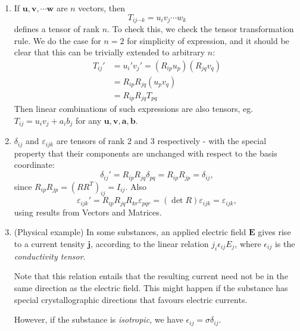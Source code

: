 \documentclass[a4paper]{article}
\begin{document}
\begin{eg}\leavevmode
  \begin{enumerate}
    \item If $\mathbf{u}, \mathbf{v}, \cdots\mathbf{w}$ are $n$ vectors, then
      \[
        T_{ij\cdots k} =u_i v_j \cdots w_k
      \]
      defines a tensor of rank $n$. To check this, we check the tensor transformation rule. We do the case for $n = 2$ for simplicity of expression, and it should be clear that this can be trivially extended to arbitrary $n$:
      \begin{align*}
        T_{ij}' &= u_i'v_j' = (R_{ip} u_p)(R_{jq}v_q)\\
        &= R_{ip}R_{jq}(u_p v_q)\\
        &= R_{ip}R_{jq}T_{pq}
      \end{align*}
      Then linear combinations of such expressions are also tensors, eg. $T_{ij} = u_i v_j + a_ib_j$ for any $\mathbf{u}, \mathbf{v}, \mathbf{a},\mathbf{b}$.
    \item $\delta_{ij}$ and $\varepsilon_{ijk}$ are tensors of rank 2 and 3 respectively - with  the special property that their components are unchanged with respect to the basis coordinate:
      \[
        \delta_{ij}' = R_{ip}R_{jq}\delta_{pq} = R_{ip}R_{jp} = \delta_{ij},
      \]
      since $R_{ip}R_{jp} = (RR^T)_{ij} = I_{ij}$. Also
      \[
        \varepsilon_{ijk}' = R_{ip}R_{jq}R_{kr}\varepsilon_{pqr} = (\det R)\varepsilon_{ijk} = \varepsilon_{ijk},
      \]
      using results from Vectors and Matrices.
    \item (Physical example) In some substances, an applied electric field $\mathbf{E}$ gives rise to a current tensity $\mathbf{j}$, according to the linear relation $j_i \epsilon_{ij} E_j$, where $\epsilon_{ij}$ is the \emph{conductivity tensor}.

      Note that this relation entails that the resulting current need not be in the same direction as the electric field. This might happen if the substance has special crystallographic directions that favours electric currents.

      However, if the substance is \emph{isotropic}, we have $\epsilon_{ij} = \sigma\delta_{ij}$.
  \end{enumerate}
\end{eg}
\end{document}
